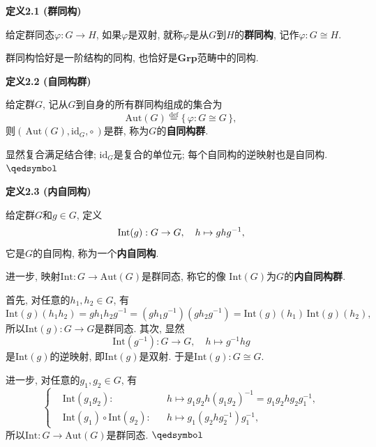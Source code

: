 \documentclass[UTF8]{ctexart}
\begin{document}
\hypertarget{sec:定义2.1}{}
\noindent\textbf{定义2.1 (群同构)}

给定群同态$\varphi:G\to H$, 如果$\varphi$是双射,
就称$\varphi$是从$G$到$H$的\textbf{群同构}, 记作$\varphi:G\cong H$.

\vspace{10pt}

群同构恰好是一阶结构的同构, 也恰好是$\mathbf{Grp}$范畴中的同构.

\vspace{10pt}

\hypertarget{sec:定义2.2}{}
\noindent\textbf{定义2.2 (自同构群)}

给定群$G$, 记从$G$到自身的所有群同构组成的集合为
\[
    \mathrm{Aut}(G)\overset{\mathrm{def}}{=}\{\,\varphi:G\cong G\,\},
\]
则$(\,\mathrm{Aut}(G),\mathrm{id}_G,\circ\,)$是群, 称为$G$的\textbf{自同构群}.


显然复合满足结合律; $\mathrm{id}_G$是复合的单位元; 每个自同构的逆映射也是自同构.
\hfill $\qedsymbol$

\vspace{10pt}

\hypertarget{sec:定义2.3}{}
\noindent\textbf{定义2.3 (内自同构)}

给定群$G$和$g\in G$, 定义
\vspace{-3pt}
\[
    \mathrm{Int}(g):G\to G,\quad h\mapsto ghg^{-1},\\[-3pt]
\]
它是$G$的自同构, 称为一个\textbf{内自同构}.

进一步, 映射$\mathrm{Int}:G\to\mathrm{Aut}(G)$是群同态, 称它的像
$\mathrm{Int}(G)$为$G$的\textbf{内自同构群}.


首先, 对任意的$h_1,h_2\in G$, 有
\[
    \mathrm{Int}(g)(h_1h_2)=gh_1h_2g^{-1}=(gh_1g^{-1})(gh_2g^{-1})
    =\mathrm{Int}(g)(h_1)\,\mathrm{Int}(g)(h_2),
\]
所以$\mathrm{Int}(g):G\to G$是群同态. 其次, 显然
\[
    \mathrm{Int}(g^{-1}):G\to G,\quad h\mapsto g^{-1}hg
\]
是$\mathrm{Int}(g)$的逆映射, 即$\mathrm{Int}(g)$是双射.
于是$\mathrm{Int}(g):G\cong G$.

进一步, 对任意的$g_1,g_2\in G$, 有
\[\left\{\begin{aligned}
    &\mathrm{Int}(g_1g_2):&&h\mapsto
    g_1g_2h(g_1g_2)^{-1}=g_1g_2hg_2g_1^{-1},\\[-3pt]
    &\mathrm{Int}(g_1)\circ\mathrm{Int}(g_2):&&h\mapsto
    g_1(g_2hg_2^{-1})g_1^{-1},
\end{aligned}\right.\]
所以$\mathrm{Int}:G\to\mathrm{Aut}(G)$是群同态. \hfill $\qedsymbol$
\end{document}
